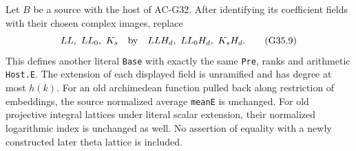 \begin{corollary}
\label{AC-G35-Base}
Let $B$ be a source  with the
host of AC-G32.  After identifying its coefficient fields
with their chosen complex images, replace
\[
 LL,\ LL_0,\ K_s
       \quad\hbox{by}\quad
 LLH_d,\ LL_0H_d,\ K_sH_d.                            \tag{G35.9}
\]
This defines another literal \texttt{Base} with exactly the
same \texttt{Pre}, ranks and arithmetic \texttt{Host.E}.
The extension of each displayed field is unramified and
has degree at most $h(k)$.  For an old archimedean function
pulled back along restriction of embeddings, the source
normalized average \texttt{meanE} is unchanged.
For old projective integral lattices under literal scalar
extension, their normalized logarithmic index is unchanged
as well.  No assertion of equality with a newly constructed
later theta lattice is included.
\end{corollary}
